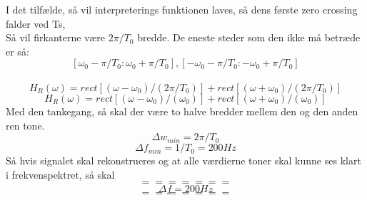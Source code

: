 \begin{EksamensOpgaver}
\begin{Eksamenssæt}[2021]
\begin{eksamensOpgave}
\begin{UnderOpgave}
                I det tilfælde, så vil interpreterings funktionen laves, så dens første zero crossing falder ved Ts, \\
                Så vil firkanterne være $2\pi/T_0$ bredde. De eneste steder som den ikke må betræde er så: 
                \[[\omega_0 - \pi/T_0: \omega_0 + \pi/T_0], [-\omega_0 -\pi/T_0 : -\omega_0 + \pi/T_0]\]\\
                \[H_R(\omega) = rect[(\omega - \omega_0)/(2\pi/T_0)] + rect[(\omega + \omega_0)/(2\pi/T_0)]\]
                \[H_R(\omega) = rect[(\omega - \omega_0)/(\omega_0)] + rect[(\omega + \omega_0)/(\omega_0)]\]
                Med den tankegang, så skal der være to halve bredder mellem den og den anden ren tone. 
                \[\Delta w_{min} = 2\pi/T_0\]
                \[\Delta f_{min} = 1/T_0 = 200Hz\]
                Så hvis signalet skal rekonstrueres og at alle værdierne toner skal kunne ses klart i frekvenspektret, så skal 
                \[=======\]
                \[\Delta f = 200Hz \]
                \[=======\]
            \end{UnderOpgave}
        \end{eksamensOpgave}
    \end{Eksamenssæt}
    \begin{Eksamenssæt}[2021 - Rettet]
        \begin{eksamensOpgave}
        
        \end{eksamensOpgave}
        \begin{eksamensOpgave}
            
        \end{eksamensOpgave}
        \begin{eksamensOpgave}
            

\end{eksamensOpgave}
\end{Eksamenssæt}
\end{EksamensOpgaver}
